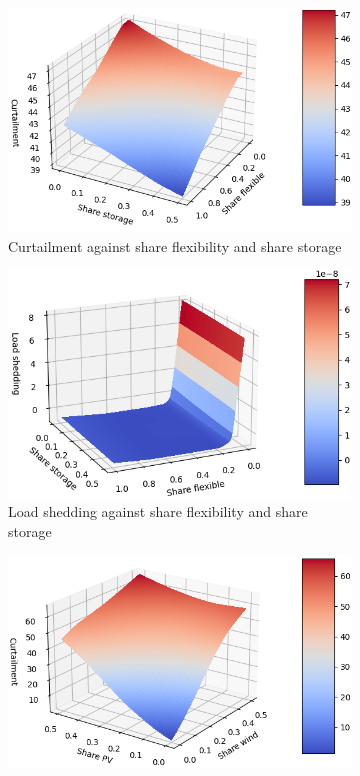 \begin{figure}[h]
    \centering
    \begin{subfigure}[b]{0.49\textwidth}
        \includegraphics[width=\textwidth]{resources/images/view_1-2-0.png}
        \caption{Curtailment against share flexibility and share storage}
        \label{fig:surf-1-2-0}
    \end{subfigure}
    \hfill
    \begin{subfigure}[b]{0.49\textwidth}
        \includegraphics[width=\textwidth]{resources/images/view_1-2-1.png}
        \caption{Load shedding against share flexibility and share storage}
        \label{fig:surf-1-2-1}
    \end{subfigure}
    \hfill
    \begin{subfigure}[b]{0.49\textwidth}
        \includegraphics[width=\textwidth]{resources/images/view_3-4-0.png}

\end{subfigure}
\end{figure}
